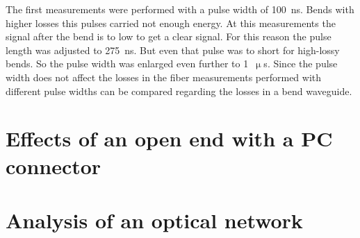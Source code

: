 The first measurements were performed with a pulse width of 100~ns. Bends with higher losses this pulses carried not enough energy. At this measurements the signal after the bend is to low to get a clear signal. For this reason the pulse length was adjusted to 275~ns. 
But even that pulse was to short for high-lossy bends. So the pulse width was enlarged even further to 1~$\upmu$s. 
Since the pulse width does not affect the losses in the fiber measurements performed with different pulse widths can be compared regarding the losses in a bend waveguide.



\section{Effects of an open end with a PC connector}

\section{Analysis of an optical network}



